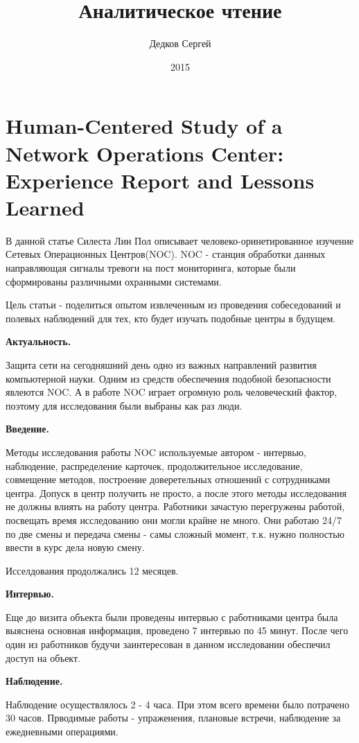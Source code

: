\documentclass[11pt, a4paper]{article}		%
\author{Дедков Сергей}
\title{Аналитическое чтение}
\date{2015}
\begin{document}
\maketitle
\tableofcontents
\newpage


\section{Human-Centered Study of a Network Operations Center: Experience Report and Lessons Learned}

В данной статье Силеста Лин Пол описывает человеко-оринетированное изучение Сетевых Операционных Центров(NOC). NOC - станция обработки данных направляющая сигналы тревоги на пост мониторинга, которые были сформированы различными охранными системами.

Цель статьи - поделиться опытом извлеченным из проведения собеседований и полевых наблюдений для тех, кто будет изучать подобные центры в будущем.

{\bf Актуальность.}

Защита сети на сегодняшний день одно из важных направлений развития компьютерной науки. Одним из средств обеспечения подобной безопасности явлеются NOC. А в работе NOC играет огромную роль человеческий фактор, поэтому для исследования были выбраны как раз люди.

{\bf Введение.}

Методы исследования работы NOC используемые автором - интервью, наблюдение, распределение карточек, продолжительное исследование, совмещение методов, построение доверетельных отношений с сотрудниками центра. Допуск в центр получить не просто, а после этого методы исследования не должны влиять на работу центра. Работники зачастую перегружены работой, посвещать время исследованию они могли крайне не много. Они работаю 24/7 по две смены и передача смены - самы сложный момент, т.к. нужно полностью ввести в курс дела новую смену.

Исселдования продолжались 12 месяцев.

{\bf Интервью.}

Еще до визита объекта были проведены интервью с работниками центра была выяснена основная информация, проведено 7 интервью по 45 минут. После чего один из работников будучи заинтересован в данном исследовании обеспечил доступ на объект.

{\bf Наблюдение. }

Наблюдение осуществлялось 2 - 4 часа. При этом всего времени было потрачено 30 часов. Прводимые работы - упраженения, плановые встречи, наблюдение за ежедневными операциями. 
\end{document}
